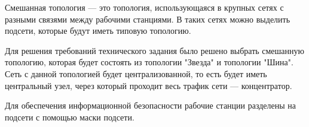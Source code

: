 \documentclass[russian,utf8,pointsection,simple,14pt]{eskdtext}
\begin{document}
Смешанная топология --- это топология, использующаяся в крупных сетях с разными связями между рабочими станциями. В таких сетях можно выделить подсети, которые будут иметь типовую топологию.

Для решения требований технического задания было решено выбрать смешанную топологию, которая будет состоять из топологии "Звезда" и топологии "Шина". Сеть с данной топологией будет централизованной, то есть будет иметь центральный узел, через который проходит весь трафик сети --- концентратор.

Для обеспечения информационной безопасности рабочие станции разделены на подсети с помощью маски подсети.
\end{document}
